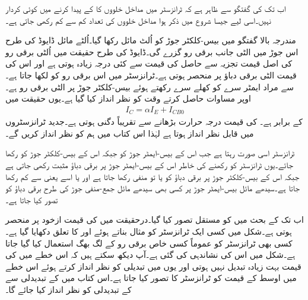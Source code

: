 اب تک کی گفتگو سے ظاہر ہے کہ  ٹرانزسٹر میں مداخل خلووں کا   کے پیدا کرنے میں کوئی کردار نہیں۔اسی لیے جیسا شروع میں ذکر ہوا مداخل خلووں کی تعداد کم سے کم رکھی جاتی ہے۔

مندرجہ بالا گفتگو میں بیس-کلکٹر جوڑ کو اُلٹ مائل رکھا گیا۔اُلٹے مائل ڈایوڈ کی طرح اس جوڑ میں الٹی جانب برقی رو  گزرے گی۔ڈایوڈ کی طرح حقیقت میں اُلٹی برقی رو کی اصل قیمت تجزیہ سے حاصل  کی قیمت سے کئی درجہ زیادہ ہوتی ہے اور اس کی قیمت الٹی برقی دباؤ پر منحصر ہوتی ہے۔ٹرانزسٹر میں اس برقی رو کو  لکھا جاتا ہے۔  سے مراد ایمٹر سرے کو کھلے سرے رکھتے ہوئے بیس-کلکٹر جوڑ پر الٹی برقی رو ہے۔اوپر مساوات حاصل کرتے وقت   کو نظر انداز کیا گیا ہے۔یوں حقیقت میں
\begin{align}
I_C=\alpha I_E+I_{CB0}
\end{align}
کے برابر ہے۔ کی قیمت درجہ حرارت  بڑھانے سے تقریباً دگنی ہوتی ہے۔جدید ٹرانزسٹروں میں  قابل نظر انداز ہوتا ہے لہٰذا اس کتاب میں ہم  کو نظر انداز کریں گے۔

 ٹرانزسٹر اسی صورت   رہتا ہے جب اس کے بیس-ایمٹر  جوڑ کو  جبکہ اس کے بیس-کلکٹر جوڑ کو  رکھا جائے۔یوں ٹرانزسٹر کو  رکھنے کی خاطر اس کے  بیس-ایمٹر جوڑ پر برقی دباؤ  مثبت رکھی جاتی ہے جبکہ اس کے بیس-کلکٹر جوڑ پر برقی دباؤ  کو یا تو منفی رکھا جاتا ہے اور یا اسے  یعنی  سے کم رکھا جاتا ہے۔سیدھے مائل بیس-ایمٹر  جوڑ پر کسی بھی سیدھے مائل جمع-منفی جوڑ کی طرح برقی دباؤ کو  تصور کیا جاتا ہے۔


اب تک کے بحث میں  کو مستقل تصور کیا گیا۔درحقیقت میں  کی قیمت ازخود  پر منحصر ہوتی ہے۔شکل  میں کسی ایک ٹرانزسٹر کو مثال بناتے ہوئے   اور  کا تعلق دکھایا گیا ہے۔کسی بھی ٹرانزسٹر کو عموماً کسی خاص برقی رو کے لگ بھگ استعمال کیا گیا جاتا ہے۔شکل میں اس کی نشاندہی کی گئی ہے۔آپ دیکھ سکتے ہیں کہ اس خطے میں  کی قیمت بہت زیادہ  تبدیل نہیں ہوتی اور یوں  میں تبدیلی کو نظر انداز کرتے ہوئے  اس خطے میں  اوسط  کے قیمت کو ٹرانزسٹر کا  تصور کیا جاتا  ہے۔اس کتاب میں  کے تبدیدلی سے   کے تبدیدلی کو نظر انداز کیا جائے گا۔ 

